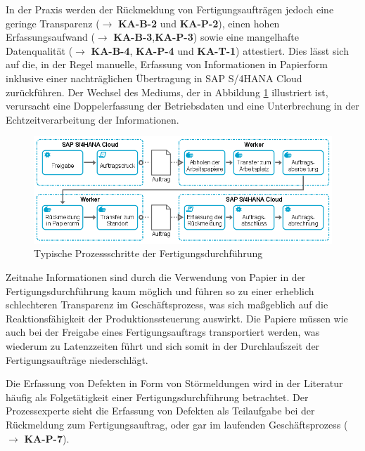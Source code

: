 In der Praxis werden der Rückmeldung von Fertigungsaufträgen jedoch eine geringe Transparenz
($\rightarrow$ \textbf{KA-B-2} und \textbf{KA-P-2}), einen hohen Erfassungsaufwand
($\rightarrow$ \textbf{KA-B-3},\textbf{KA-P-3}) sowie eine mangelhafte Datenqualität
($\rightarrow$ \textbf{KA-B-4}, \textbf{KA-P-4} und \textbf{KA-T-1}) attestiert. 
Dies lässt sich auf die, in der Regel manuelle, Erfassung von Informationen in Papierform inklusive einer nachträglichen Übertragung in SAP S/4HANA Cloud zurückführen. Der Wechsel des Mediums, der in Abbildung \ref{fig:Typische Prozessschritte der Fertigungsdurchführung} illustriert ist, verursacht eine Doppelerfassung der Betriebsdaten und eine Unterbrechung in der Echtzeitverarbeitung der Informationen. 

\begin{figure}[H]
	\centering 
    \includegraphics[width=\textwidth]{img/paper.png}	
    \caption[Typische Prozessschritte der Fertigungsdurchführung]
    {Typische Prozessschritte der Fertigungsdurchführung\protect\footnotemark}
    \label{fig:Typische Prozessschritte der Fertigungsdurchführung}
\end{figure}

Zeitnahe Informationen sind durch die Verwendung von Papier in der Fertigungsdurchführung kaum möglich und führen so zu einer erheblich schlechteren Transparenz im Geschäftsprozess, was sich maßgeblich auf die Reaktionsfähigkeit der Produktionssteuerung auswirkt. Die Papiere müssen wie auch bei der Freigabe eines Fertigungsauftrags transportiert werden, was wiederum zu Latenzzeiten führt und sich somit in der Durchlaufszeit der Fertigungsaufträge niederschlägt.

Die Erfassung von Defekten in Form von Störmeldungen wird in der Literatur häufig als Folgetätigkeit einer Fertigungsdurchführung betrachtet.
\cite{Dickersbach.2014}
Der Prozessexperte sieht die Erfassung von Defekten als Teilaufgabe bei der Rückmeldung zum Fertigungsauftrag, oder gar im laufenden Geschäftsprozess
($\rightarrow$ \textbf{KA-P-7}).

